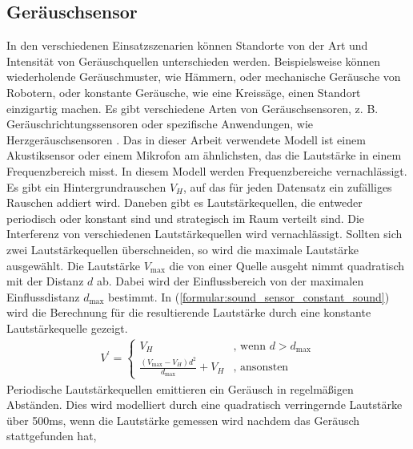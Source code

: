 \subsection{Geräuschsensor}
In den verschiedenen Einsatzszenarien können Standorte von der Art und Intensität von Geräuschquellen unterschieden werden.
Beispielsweise können wiederholende Geräuschmuster, wie Hämmern, oder mechanische Geräusche von Robotern,
oder konstante Geräusche, wie eine Kreissäge, einen Standort einzigartig machen.
\newline
\newline
Es gibt verschiedene Arten von Geräuschsensoren, z. B. Geräuschrichtungssensoren \cite{tiete2014soundcompass} oder
spezifische Anwendungen, wie Herzgeräuschsensoren \cite{zhang2016design}.
Das in dieser Arbeit verwendete Modell ist einem Akustiksensor \cite{sessler1991acoustic} oder einem Mikrofon am ähnlichsten,
das die Lautstärke in einem Frequenzbereich misst.
\newline
\newline
In diesem Modell werden Frequenzbereiche vernachlässigt.
Es gibt ein Hintergrundrauschen $V_H$, auf das für jeden Datensatz ein zufälliges Rauschen addiert wird.
Daneben gibt es Lautstärkequellen, die entweder periodisch oder konstant sind und strategisch im Raum verteilt sind.
Die Interferenz von verschiedenen Lautstärkequellen wird vernachlässigt.
Sollten sich zwei Lautstärkequellen überschneiden, so wird die maximale Lautstärke ausgewählt.
\newline
\newline
Die Lautstärke $V_{\max}$ die von einer Quelle ausgeht nimmt quadratisch mit der Distanz $d$ ab.
Dabei wird der Einflussbereich von der maximalen Einflussdistanz $d_{\max}$ bestimmt.
In (\ref{formular:sound_sensor_constant_sound}) wird die Berechnung für die resultierende Lautstärke durch eine konstante Lautstärkequelle gezeigt.
\begin{align}
    \label{formular:sound_sensor_constant_sound}
    V^{\prime} = \begin{cases}
                     V_H & \text{, wenn } d > d_{\max} \\
                     \frac{(V_{\max} - V_H)d^2}{d_{\max}} + V_H & \text{, ansonsten}
    \end{cases}
\end{align}
\newpage
Periodische Lautstärkequellen emittieren ein Geräusch in regelmäßigen Abständen.
Dies wird modelliert durch eine quadratisch verringernde Lautstärke über 500ms,
wenn die Lautstärke gemessen wird nachdem das Geräusch stattgefunden hat,
